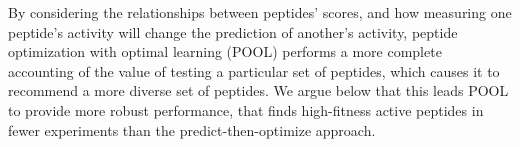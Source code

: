 By considering the relationships between peptides' scores, and how measuring one peptide's activity will change the prediction of another's activity, peptide optimization with optimal learning (POOL) performs a more complete accounting of the value of testing a particular set of peptides, which causes it to recommend a more diverse set of peptides. 
We argue below that this leads POOL to provide more robust performance, that finds high-fitness active peptides in fewer experiments than the predict-then-optimize approach.

